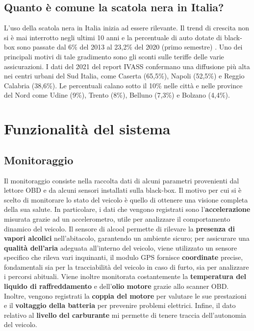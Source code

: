 \documentclass[12pt, a4paper, italian]{report}
\numberwithin{figure}{chapter}
\numberwithin{table}{chapter}
\begin{document}
\section{Quanto è comune la scatola nera in Italia?}
L'uso della scatola nera in Italia inizia ad essere rilevante. Il trend di crescita non si è mai interrotto negli ultimi 10 anni e la percentuale di auto dotate di black-box sono passate dal 6\% del 2013 al 23,2\% del 2020 (primo semestre)  \cite{Telepass}. Uno dei principali motivi di tale gradimento sono gli sconti sulle teriffe delle varie assicurazioni. I dati del 2021 del report IVASS confermano una diffusione più alta nei centri urbani del Sud Italia, come Caserta (65,5\%), Napoli (52,5\%) e Reggio Calabria (38,6\%). Le percentuali calano sotto il 10\% nelle città e nelle province del Nord come Udine (9\%), Trento (8\%), Belluno (7,3\%) e Bolzano (4,4\%).

\chapter{Funzionalità del sistema}
\section{Monitoraggio}
Il monitoraggio consiste nella raccolta dati di alcuni parametri provenienti dal lettore OBD e da alcuni sensori installati sulla black-box. 
Il motivo per cui si è scelto di monitorare lo stato del veicolo è quello di ottenere una visione completa della sua salute. In particolare, i dati che vengono registrati sono l'\textbf{accelerazione} misurata grazie ad un accelerometro, utile per analizzare il comportamento dinamico del veicolo. Il sensore di alcool permette di rilevare la \textbf{presenza di vapori alcolici} nell'abitacolo, garantendo un ambiente sicuro; per assicurare una \textbf{qualità dell'aria} adeguata all'interno del veicolo, viene utilizzato un sensore specifico che rileva vari inquinanti, il modulo GPS fornisce \textbf{coordinate} precise, fondamentali sia per la tracciabilità del veicolo in caso di furto, sia per analizzare i percorsi abituali. Viene inoltre monitorata  costantemente la \textbf{temperatura del liquido di raffreddamento} e dell'\textbf{olio motore} grazie allo scanner OBD. Inoltre, vengono registrati la \textbf{coppia del motore} per valutare le sue prestazioni e il \textbf{voltaggio della batteria} per prevenire problemi elettrici.
Infine, il dato relativo al \textbf{livello del carburante} mi permette di tenere traccia dell'autonomia del veicolo. 
\end{document}
